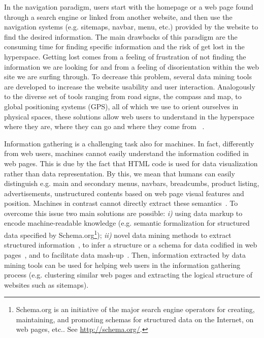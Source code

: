 In the navigation paradigm, users start with the homepage or a web page found through a search engine or linked from another website, and then use the navigation systems (e.g. sitemaps, navbar, menu, etc.) provided by the website to find the desired information. %
The main drawbacks of this paradigm are the consuming time for finding specific information and the risk of get lost in the hyperspace. %
Getting lost comes from a feeling of frustration of not finding the information we are looking for and from a feeling of disorientation within the web site we are surfing through. To decrease this problem, several data mining tools are developed to increase the website usability and user interaction.
Analogously to the diverse set of tools ranging from road signs, the compass and map, to global positioning systems (GPS), all of which we use to orient ourselves in physical spaces, these solutions allow web users to understand in the hyperspace where they are, where they can go and where they come from ~\cite{Nielsen:2006}.

Information gathering is a challenging task also for machines. In fact, differently from web users, machines cannot easily understand the information codified in web pages. %
This is due by the fact that HTML code is used for data visualization rather than data representation. By this, we mean that humans can easily distinguish e.g. main and secondary menus, navbars, breadcumbs, product listing, advertisements, unstructured contents based on web page visual features and position. Machines in contrast cannot directly extract these semantics~\cite{Keller:2013}. To overcome this issue two main solutions are possible: \emph{i)} using data markup to encode machine-readable knowledge (e.g. semantic formalization for structured data specified by
Schema.org\footnote{Schema.org is an initiative of the major search engine operators for creating, maintaining, and promoting schemas for structured data on the Internet, on web pages, etc.. See \url{http://schema.org/}.}); \emph{ii)} novel data mining methods to extract structured information~\cite{Lanotte:2014}, to infer a structure or a schema for data codified in web pages~\cite{Zhai:2005}, and to facilitate data mash-up~\cite{Dong:2014, Bronzi:2013}. Then, information extracted by data mining tools can be used for helping web users in the information gathering process (e.g. clustering similar web pages and extracting the logical structure of websites such as sitemaps). 

